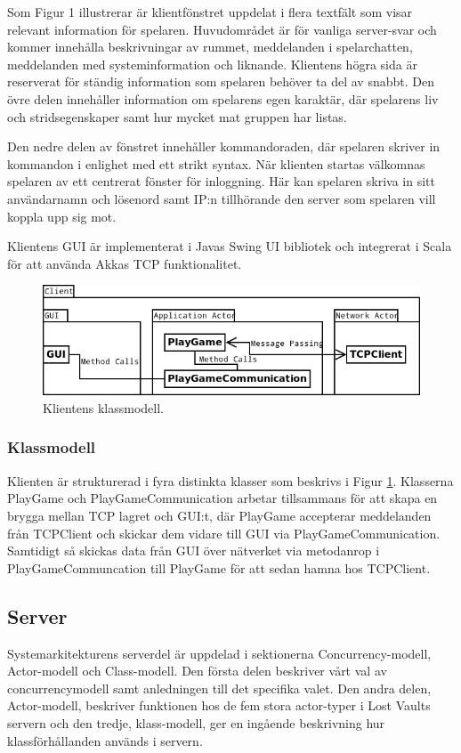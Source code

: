 \documentclass[a4paper]{article}
\begin{document}
Som Figur 1 illustrerar är klientfönstret uppdelat i flera textfält som visar relevant information för spelaren. Huvudområdet är för vanliga server-svar och kommer innehålla beskrivningar 
av rummet, meddelanden i spelarchatten, meddelanden med systeminformation och liknande. Klientens högra sida är reserverat för ständig information som spelaren behöver ta del av snabbt. 
Den övre delen innehåller information om spelarens egen karaktär, där spelarens liv och stridsegenskaper samt hur mycket mat gruppen har listas. 

Den nedre delen av fönstret innehåller kommandoraden, där spelaren skriver in kommandon i enlighet med ett strikt syntax. När klienten startas välkomnas spelaren 
av ett centrerat fönster för inloggning. Här kan spelaren skriva in sitt användarnamn och lösenord samt IP:n tillhörande den server som spelaren vill koppla upp sig mot. 

Klientens GUI är implementerat i Javas Swing UI bibliotek och integrerat i Scala för att använda Akkas TCP funktionalitet.

\begin{figure}[hbt]
\centering
\includegraphics[width=1.0\textwidth]{clientuml1}
\caption{\label{fig:ClientArch}Klientens klassmodell.}
\end{figure}
    
\subsubsection{Klassmodell}
Klienten är strukturerad i fyra distinkta klasser som beskrivs i Figur \ref{fig:ClientArch}. Klasserna PlayGame och PlayGameCommunication arbetar 
tillsammans för att skapa en brygga mellan TCP lagret och GUI:t, där PlayGame accepterar meddelanden från TCPClient och skickar dem 
vidare till GUI via PlayGameCommunication. Samtidigt så skickas data från GUI över nätverket via metodanrop i PlayGameCommuncation till 
PlayGame för att sedan hamna hos TCPClient.

\subsection{Server}
Systemarkitekturens serverdel är uppdelad i sektionerna Concurrency-modell, Actor-modell och Class-modell. Den första delen beskriver vårt 
val av concurrencymodell samt anledningen till det specifika valet. Den andra delen, Actor-modell, beskriver funktionen hos de fem stora actor-typer i Lost Vaults servern och 
den tredje, klass-modell, ger en ingående beskrivning hur klassförhållanden används i servern.
\end{document}
